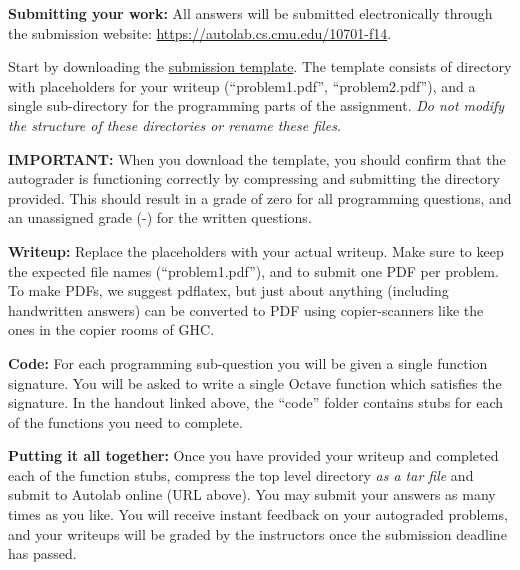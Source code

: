 \documentclass{article}
\begin{document}
\begin{itemize*}
\item \textbf{Submitting your work:} All answers will be submitted electronically through the submission website: \url{https://autolab.cs.cmu.edu/10701-f14}. 
\begin{itemize*}
\item Start by downloading the \href{https://autolab.cs.cmu.edu/10701-f14/attachments/view/229}{submission template}. The template consists of directory with placeholders for your writeup (``problem1.pdf'', ``problem2.pdf''), and a single sub-directory for the programming parts of the assignment. \emph{Do not modify the structure of these directories or rename these files.} 
\item \textbf{IMPORTANT:} When you download the template, you should confirm that the autograder is functioning correctly by compressing and submitting the directory provided. This should result in a grade of zero for all programming questions, and an unassigned grade (-) for the written questions. 
\item \textbf{Writeup:} Replace the placeholders with your actual writeup. Make sure to keep the expected file names (``problem1.pdf''), and to submit one PDF per problem.  To make PDFs, we suggest pdflatex, but just about anything (including handwritten answers) can be converted to PDF using copier-scanners like the ones in the copier rooms of GHC.
\item \textbf{Code:} For each programming sub-question you will be given a single function signature. You will be asked to write a single Octave function which satisfies the signature. In the handout linked above, the ``code'' folder contains stubs for each of the functions you need to complete. 
\item \textbf{Putting it all together:} Once you have provided your writeup and completed each of the function stubs, compress the top level directory \emph{as a tar file} and submit to Autolab online (URL above). You may submit your answers as many times as you like. You will receive instant feedback on your autograded problems, and your writeups will be graded by the instructors once the submission deadline has passed. 
\end{itemize*}

\end{itemize*}

\fi

%

\end{document}
